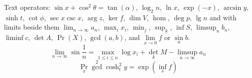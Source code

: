 \documentclass{article}
\begin{document}
Text operators: $\sin x + \cos^2\theta = \tan(\alpha)$, $\log_2 n$, $\ln x$, $\exp(-x)$, $\arcsin y$, $\sinh t$, $\cot\phi$, $\sec x\csc x$,
$\arg z$, $\ker f$, $\dim V$, $\hom$, $\deg p$, $\lg n$ and with limits beside them $\lim_{n\to\infty} a_n$, $\max_{i} x_i$, $\min_j$, $\sup_k$, $\inf S$,
$\limsup_{n} b_n$, $\liminf c$, $\det A$, $\Pr(X)$, $\gcd(a,b)$, and $\lim\limits_{x\to 0} f$ or $\sin\limits_a b$.
\[ \lim_{n\to\infty} \sin\frac{1}{n} = \max_{1\le i\le n} \log x_i + \det_{k} M - \limsup_{n\to\infty} a_n \]
\[ \Pr_{x} \gcd^{2} \cosh^{2}_{t} y = \exp\left(\inf_{s} f\right) \]
\end{document}
